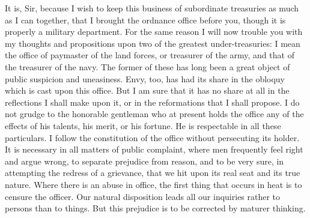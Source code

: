 It is, Sir, because I wish to keep this business of subordinate treasuries as much as I can together, that I brought the ordnance office before you, though it is properly a military department. For the same reason I will now trouble you with my thoughts and propositions upon two of the greatest under-treasuries: I mean the office of paymaster of the land forces, or treasurer of the army, and that of the treasurer of the navy. The former of these has long been a great object of public suspicion and uneasiness. Envy, too, has had its share in the obloquy which is cast upon this office. But I am sure that it has no share at all in the reflections I shall make upon it, or in the reformations that I shall propose. I do not grudge to the honorable gentleman who at present holds the office any of the effects of his talents, his merit, or his fortune. He is respectable in all these particulars. I follow the constitution of the office without persecuting its holder. It is necessary in all matters of public complaint, where men frequently feel right and argue wrong, to separate prejudice from reason, and to be very sure, in attempting the redress of a grievance, that we hit upon its real seat and its true nature. Where there is an abuse in office, the first thing that occurs in heat is to censure the officer. Our natural disposition leads all our inquiries rather to persons than to things. But this prejudice is to be corrected by maturer thinking.

